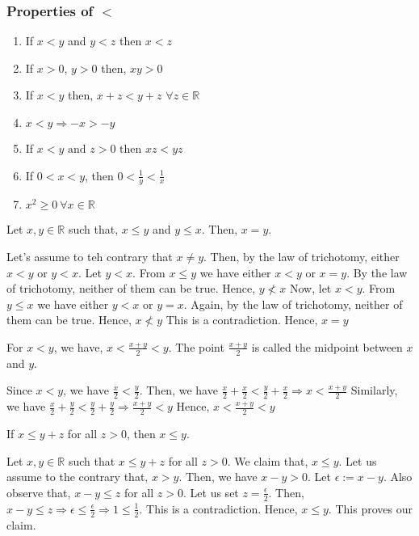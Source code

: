 \documentclass{scrartcl}
\newcommand{\rn}{\mathbb{R}}
\begin{document}
    \subsubsection{Properties of \texorpdfstring{$<$}{lt}}
    \begin{enumerate}[label={(\roman*)}]
        \item If $x < y$ and $y < z$ then $x < z$
        \item If $x > 0$, $y>0$ then, $xy >0$
        \item If $x < y$ then, $x + z < y +z$ $\forall z \in \rn$
        \item $x < y \Rightarrow -x > -y$
        \item If $x < y \text{ and } z > 0 \text{ then } xz < yz$
        \item If $0<x<y$, then $0<\frac{1}{y}<\frac{1}{x}$
        \item $x^2 \geq 0 ~ \forall x \in \rn$
    \end{enumerate}
    \begin{remark}
        Let $x, y \in \rn$ such that, $x \leq y$ and $y \leq x$. Then, $x=y$. 
        \begin{proof*}
            Let's assume to teh contrary that $x \neq y$. Then, by the law of trichotomy, either $x < y$ or $y < x$.
            Let $y < x$. From $x \leq y$ we have either $x < y$ or $x = y$. By the law of trichotomy, neither of them can be true. Hence, $y \nless x$
            Now, let $x < y$. From $y \leq x$ we have either $y < x$ or $y = x$. Again, by the law of trichotomy, neither of them can be true. Hence, $x \nless y$
            This is a contradiction. Hence, $x = y$
        \end{proof*}
    \end{remark}
	\begin{example}
        For $x<y$, we have, $x<\frac{x+y}{2}<y$. The point $\frac{x + y}{2}$ is called the midpoint between $x$ and $y$.
        \begin{proof*}
            Since $x < y$, we have $\frac{x}{2} < \frac{y}{2}$. Then, we have $\frac{x}{2} + \frac{x}{2} < \frac{y}{2} + \frac{x}{2} \Rightarrow x < \frac{x + y}{2}$
		    Similarly, we have $\frac{x}{2} + \frac{y}{2} < \frac{y}{2} + \frac{y}{2}\Rightarrow \frac{x + y}{2} < y$
            Hence, $x < \frac{x + y}{2} < y$
        \end{proof*}
	\end{example}
    \begin{example}
        If $x \leq y + z$ for all $z > 0$, then $x \leq y$.
        \begin{proof*}
            Let $x,y \in \rn$ such that $x \leq y + z$ for all $z > 0$. We claim that, $x \leq y$. Let us assume to the contrary that, $x > y$. Then, we have $x - y > 0$. Let $\epsilon := x - y$. Also observe that, $x-y \leq z$ for all $z > 0$. Let us set $z = \frac{\epsilon}{2}$. Then, $x - y \leq z \Rightarrow \epsilon \leq \frac{\epsilon}{2} \Rightarrow 1 \leq \frac{1}{2}$. This is a contradiction. Hence, $x \leq y$. This proves our claim.
        \end{proof*}
    \end{example}
\end{document}
